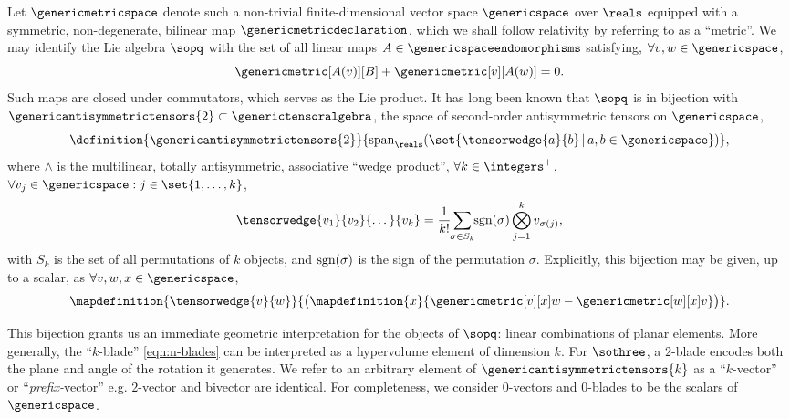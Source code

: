 \documentclass{article}
\begin{document}
Let $\genericmetricspace$ denote such a non-trivial finite-dimensional vector space $\genericspace$ over $\reals$ equipped with a symmetric, non-degenerate, bilinear map $\genericmetricdeclaration$, which we shall follow relativity by referring to as a \enquote{metric}. We may identify the Lie algebra $\sopq$ with the set of all linear maps $A\in\genericspaceendomorphisms$ satisfying, $\forall v,w\in\genericspace$,
\begin{equation}
    \genericmetric[A(v)][B]+\genericmetric[v][A(w)]=0.
\end{equation}
\noindent Such maps are closed under commutators, which serves as the Lie product. It has long been known that $\sopq$ is in bijection\cite{fulton-harris} with $\genericantisymmetrictensors{2}\subset\generictensoralgebra$, the space of second-order antisymmetric tensors on $\genericspace$\cite{bourbaki},
\begin{equation}\label{eqn:antisymmetric-tensors}
    \definition{\genericantisymmetrictensors{2}}{\textup{span}_{\reals}(\set{\tensorwedge{a}{b}\,\vert\,a,b\in\genericspace})},
\end{equation}
\noindent where $\wedge$ is the multilinear, totally antisymmetric, associative \enquote{wedge product}, $\forall k\in\integers^{+}$,$\forall v_{j}\in\genericspace : j\in\set{1,\dots,k}$,
\begin{equation}\label{eqn:n-blades}
    \tensorwedge{v_{1}}{v_{2}}{\dots}{v_{k}}=\frac{1}{k!}\smashoperator{\sum_{\sigma\in S_{k}}}\textup{sgn}(\sigma)\bigotimes_{j=1}^{k}v_{\sigma(j)},
\end{equation}
\noindent with $S_{k}$ is the set of all permutations of $k$ objects, and $\textup{sgn}(\sigma)$ is the sign of the permutation $\sigma$. Explicitly, this bijection may be given, up to a scalar, as $\forall v,w,x\in\genericspace$,
\begin{equation}\label{eqn:sothree-action-generic}
    \mapdefinition{\tensorwedge{v}{w}}{\big(\mapdefinition{x}{\genericmetric[v][x]w-\genericmetric[w][x]v}\big)}.
\end{equation}

This bijection grants us an immediate geometric interpretation for the objects of $\sopq$: linear combinations of planar elements. More generally, the \enquote{$k$-blade}\cite{doran-lasenby} \eqref{eqn:n-blades} can be interpreted as a hypervolume element of dimension $k$. For $\sothree$, a $2$-blade encodes both the plane and angle of the rotation it generates. We refer to an arbitrary element of $\genericantisymmetrictensors{k}$ as a \enquote{$k$-vector}\cite{doran-lasenby} or \enquote{\textit{prefix-}vector} e.g. $2$-vector and bivector are identical. For completeness, we consider $0$-vectors and $0$-blades to be the scalars of $\genericspace$. 
\end{document}
